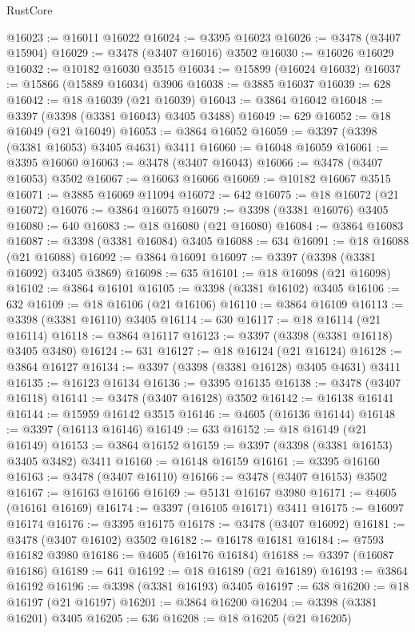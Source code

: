 \begin{lexlean}{RustCore}
\begin{coremodule}
@16023 := @16011 @16022
@16024 := @3395 @16023
@16026 := @3478 (@3407 @15904)
@16029 := @3478 (@3407 @16016) @3502
@16030 := @16026 @16029
@16032 := @10182 @16030 @3515
@16034 := @15899 (@16024 @16032)
@16037 := @15866 (@15889 @16034) @3906
@16038 := @3885 @16037
@16039 := 628
@16042 := @18 @16039 (@21 @16039)
@16043 := @3864 @16042
@16048 := @3397 (@3398 (@3381 @16043) @3405 @3488)
@16049 := 629
@16052 := @18 @16049 (@21 @16049)
@16053 := @3864 @16052
@16059 := @3397 (@3398 (@3381 @16053) @3405 @4631) @3411
@16060 := @16048 @16059
@16061 := @3395 @16060
@16063 := @3478 (@3407 @16043)
@16066 := @3478 (@3407 @16053) @3502
@16067 := @16063 @16066
@16069 := @10182 @16067 @3515
@16071 := @3885 @16069 @11094
@16072 := 642
@16075 := @18 @16072 (@21 @16072)
@16076 := @3864 @16075
@16079 := @3398 (@3381 @16076) @3405
@16080 := 640
@16083 := @18 @16080 (@21 @16080)
@16084 := @3864 @16083
@16087 := @3398 (@3381 @16084) @3405
@16088 := 634
@16091 := @18 @16088 (@21 @16088)
@16092 := @3864 @16091
@16097 := @3397 (@3398 (@3381 @16092) @3405 @3869)
@16098 := 635
@16101 := @18 @16098 (@21 @16098)
@16102 := @3864 @16101
@16105 := @3398 (@3381 @16102) @3405
@16106 := 632
@16109 := @18 @16106 (@21 @16106)
@16110 := @3864 @16109
@16113 := @3398 (@3381 @16110) @3405
@16114 := 630
@16117 := @18 @16114 (@21 @16114)
@16118 := @3864 @16117
@16123 := @3397 (@3398 (@3381 @16118) @3405 @3480)
@16124 := 631
@16127 := @18 @16124 (@21 @16124)
@16128 := @3864 @16127
@16134 := @3397 (@3398 (@3381 @16128) @3405 @4631) @3411
@16135 := @16123 @16134
@16136 := @3395 @16135
@16138 := @3478 (@3407 @16118)
@16141 := @3478 (@3407 @16128) @3502
@16142 := @16138 @16141
@16144 := @15959 @16142 @3515
@16146 := @4605 (@16136 @16144)
@16148 := @3397 (@16113 @16146)
@16149 := 633
@16152 := @18 @16149 (@21 @16149)
@16153 := @3864 @16152
@16159 := @3397 (@3398 (@3381 @16153) @3405 @3482) @3411
@16160 := @16148 @16159
@16161 := @3395 @16160
@16163 := @3478 (@3407 @16110)
@16166 := @3478 (@3407 @16153) @3502
@16167 := @16163 @16166
@16169 := @5131 @16167 @3980
@16171 := @4605 (@16161 @16169)
@16174 := @3397 (@16105 @16171) @3411
@16175 := @16097 @16174
@16176 := @3395 @16175
@16178 := @3478 (@3407 @16092)
@16181 := @3478 (@3407 @16102) @3502
@16182 := @16178 @16181
@16184 := @7593 @16182 @3980
@16186 := @4605 (@16176 @16184)
@16188 := @3397 (@16087 @16186)
@16189 := 641
@16192 := @18 @16189 (@21 @16189)
@16193 := @3864 @16192
@16196 := @3398 (@3381 @16193) @3405
@16197 := 638
@16200 := @18 @16197 (@21 @16197)
@16201 := @3864 @16200
@16204 := @3398 (@3381 @16201) @3405
@16205 := 636
@16208 := @18 @16205 (@21 @16205)

\end{coremodule}
\end{lexlean}
